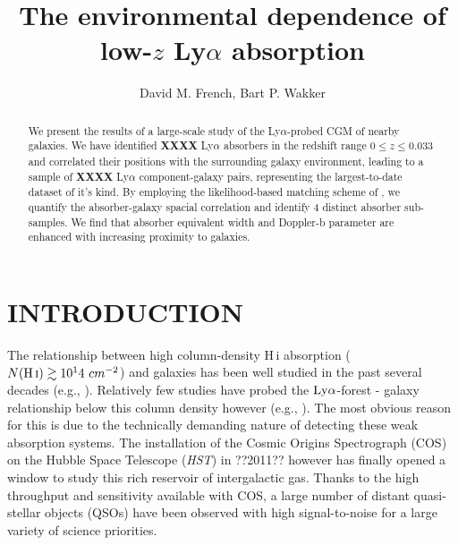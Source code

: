 \documentclass[twocolumn,tighten]{aastex62}
\newcommand{\HI}{\mbox{H\,{\sc i}} }
\begin{document}
\title{The environmental dependence of low-$z$ Ly$\alpha$ absorption}


\author{David M. French, Bart P. Wakker}


\begin{abstract}
We present the results of a large-scale study of the Ly$\alpha$-probed CGM of nearby galaxies. We have identified \textbf{XXXX} Ly$\alpha$ absorbers in the redshift range $0 \leq z \leq 0.033$ and correlated their positions with the surrounding galaxy environment, leading to a sample of \textbf{XXXX} Ly$\alpha$ component-galaxy pairs, representing the largest-to-date dataset of it's kind. By employing the likelihood-based matching scheme of \cite{french2017}, we quantify the absorber-galaxy spacial correlation and identify 4 distinct absorber sub-samples. We find that absorber equivalent width and Doppler-b parameter are enhanced with increasing proximity to galaxies.

\end{abstract}




\section{INTRODUCTION}

The relationship between high column-density \HI absorption ($N(\HI) \gtrsim 10^14 ~cm^{-2}$) and galaxies has been well studied in the past several decades (e.g., \citealt{lanzetta1995, bowen1996, chen2003, chen2008, rubin2010, rubin2012, steidel2010, prochaska2011b}). Relatively few studies have probed the $\rm Ly\alpha$-forest - galaxy relationship below this column density however (e.g., \citealt{wakker2009, french2017, bowen2002}). The most obvious reason for this is due to the technically demanding nature of detecting these weak absorption systems. The installation of the Cosmic Origins Spectrograph (COS) on the Hubble Space Telescope (\emph{HST}) in ??2011?? however has finally opened a window to study this rich reservoir of intergalactic gas.  Thanks to the high throughput and sensitivity available with COS, a large number of distant quasi-stellar objects (QSOs) have been observed with high signal-to-noise for a large variety of science priorities. 
\end{document}
